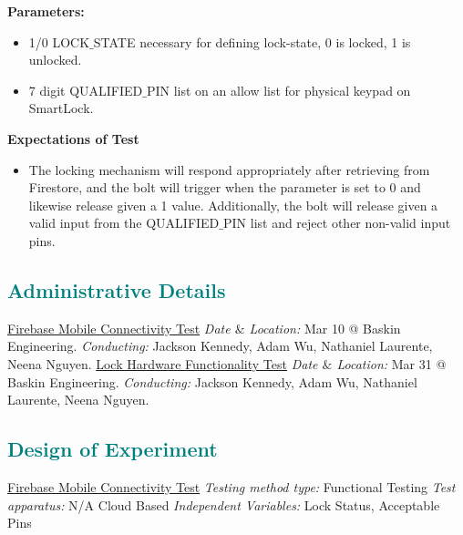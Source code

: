 \textbf{Parameters:}
\begin{itemize}

\item 1/0 LOCK$\_$STATE necessary for defining lock-state, 0 is locked, 1 is unlocked.
\item 7 digit QUALIFIED$\_$PIN list on an allow list for physical keypad on SmartLock.
\end{itemize}
\newpage
\textbf{Expectations of Test}
\begin{itemize}

\item The locking mechanism will respond appropriately after retrieving from Firestore, and the bolt will trigger when the parameter is set to 0 and likewise release given a 1 value. Additionally, the bolt will release given a valid input from the QUALIFIED$\_$PIN list and reject other non-valid input pins.

\end{itemize}
\textcolor{teal}{\subsection{Administrative Details}}
\noindent\underline{Firebase Mobile Connectivity Test}
\newline
\newline
\textit{Date $\&$ Location:} Mar 10 @ Baskin Engineering.
\newline
\textit{Conducting:} Jackson Kennedy, Adam Wu, Nathaniel Laurente, Neena Nguyen.
\newline
\newline
\underline{Lock Hardware Functionality Test}
\newline
\newline
\textit{Date $\&$ Location:} Mar 31 @ Baskin Engineering.
\newline
\textit{Conducting:} Jackson Kennedy, Adam Wu, Nathaniel Laurente, Neena Nguyen.
\newline
\textcolor{teal}{\subsection{Design of Experiment}}
\noindent\underline{Firebase Mobile Connectivity Test}
\newline
\textit{Testing method type:} Functional Testing
\newline
\textit{Test apparatus:} N/A Cloud Based
\newline
\textit{Independent Variables:} Lock Status, Acceptable Pins
